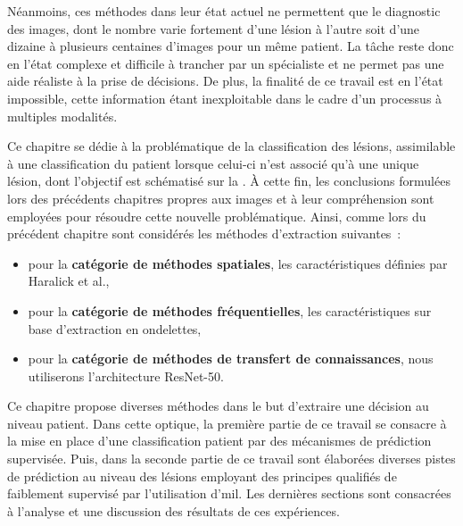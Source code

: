 Néanmoins, ces méthodes dans leur état actuel ne permettent que le diagnostic des images, dont le nombre varie fortement d'une lésion à l'autre soit d'une dizaine à plusieurs centaines d'images pour un même patient. La tâche reste donc en l'état complexe et difficile à trancher par un spécialiste et ne permet pas une aide réaliste à la prise de décisions. De plus, la finalité de ce travail est en l'état impossible, cette information étant inexploitable dans le cadre d'un processus à multiples modalités.\par

Ce chapitre se dédie à la problématique de la classification des lésions, assimilable à une classification du patient lorsque celui-ci n'est associé qu'à une unique lésion, dont l'objectif est schématisé sur la . À cette fin, les conclusions formulées lors des précédents chapitres propres aux images et à leur compréhension sont employées pour résoudre cette nouvelle problématique. Ainsi, comme lors du précédent chapitre sont considérés les méthodes d'extraction suivantes~:
\begin{itemize}
    \item pour la \textbf{catégorie de méthodes spatiales}, les caractéristiques définies par Haralick et al.\cite{Haralick1973},
    \item pour la \textbf{catégorie de méthodes fréquentielles}, les caractéristiques sur base d'extraction en ondelettes,
    \item pour la \textbf{catégorie de méthodes de transfert de connaissances}, nous utiliserons l'architecture ResNet-50.
\end{itemize}\par\par

Ce chapitre propose diverses méthodes dans le but d'extraire une décision au niveau patient. Dans cette optique, la première partie de ce travail se consacre à la mise en place d'une classification patient par des mécanismes de prédiction supervisée. Puis, dans la seconde partie de ce travail sont élaborées diverses pistes de prédiction au niveau des lésions employant des principes qualifiés de faiblement supervisé par l'utilisation d'\gls{mil}. Les dernières sections sont consacrées à l'analyse et une discussion des résultats de ces expériences.\par

